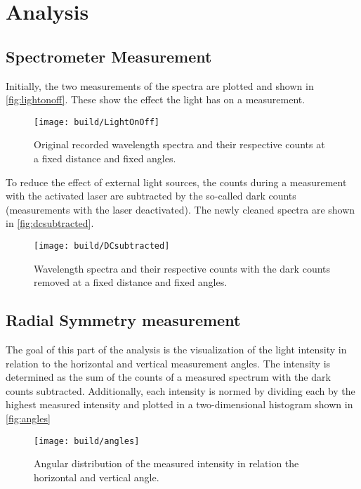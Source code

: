 \newpage
\section{Analysis}
\label{sec:Analysis}

\subsection{Spectrometer Measurement}

Initially, the two measurements of the spectra are plotted and shown in \autoref{fig:lightonoff}. 
These show the effect the light has on a measurement.

\begin{figure}[H]
	\centering
	\texttt{[image: build/LightOnOff]}
	\caption{Original recorded wavelength spectra and their respective counts at a fixed distance and fixed angles.}
	\label{fig:lightonoff}
\end{figure}

To reduce the effect of external light sources, the counts during a measurement with the activated laser are subtracted by the
so-called dark counts (measurements with the laser deactivated). The newly cleaned spectra are shown in \autoref{fig:dcsubtracted}.

\begin{figure}[H]
	\centering
	\texttt{[image: build/DCsubtracted]}
	\caption{Wavelength spectra and their respective counts with the dark counts removed at a fixed distance and fixed angles.}
	\label{fig:dcsubtracted}
\end{figure}

\subsection{Radial Symmetry measurement}
The goal of this part of the analysis is the visualization of the light intensity in relation to the horizontal and vertical measurement angles.
The intensity is determined as the sum of the counts of a measured spectrum with the dark counts subtracted. 
Additionally, each intensity is normed by dividing each by the highest measured intensity and plotted in a two-dimensional histogram shown in \autoref{fig:angles}

\begin{figure}
	\centering
	\texttt{[image: build/angles]}
	\caption{Angular distribution of the measured intensity in relation the horizontal and vertical angle.}
	\label{fig:angles}
\end{figure}

